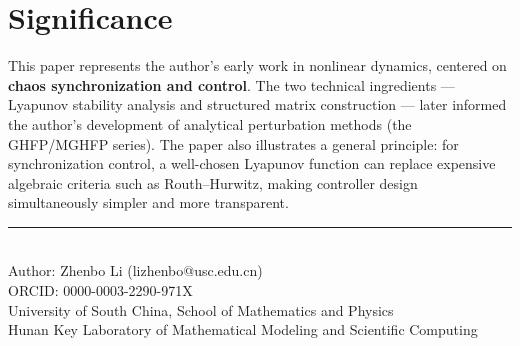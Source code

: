 \documentclass[11pt,a4paper]{article}
\begin{document}
\section{Significance}

This paper represents the author's early work in nonlinear dynamics, centered on \textbf{chaos synchronization and control}. The two technical ingredients --- Lyapunov stability analysis and structured matrix construction --- later informed the author's development of analytical perturbation methods (the GHFP/MGHFP series). The paper also illustrates a general principle: for synchronization control, a well-chosen Lyapunov function can replace expensive algebraic criteria such as Routh--Hurwitz, making controller design simultaneously simpler and more transparent.

\vfill
\begin{center}
\small\rule{0.5\textwidth}{0.3pt}\\[4pt]
\small\color{primary} Author: Zhenbo Li (lizhenbo@usc.edu.cn)\\
\small ORCID: 0000-0003-2290-971X\\
\small University of South China, School of Mathematics and Physics\\
\small Hunan Key Laboratory of Mathematical Modeling and Scientific Computing
\end{center}
\end{document}
